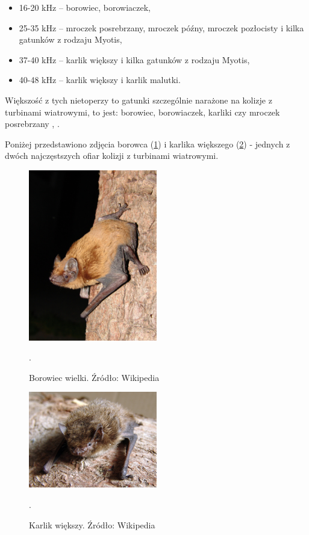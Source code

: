 \documentclass{sprz}
\begin{document}
\begin{itemize}
  \item{16-20 kHz – borowiec, borowiaczek,}
  \item{25-35 kHz – mroczek posrebrzany, mroczek późny, mroczek pozłocisty i kilka gatunków z rodzaju Myotis,}
  \item{37-40 kHz – karlik większy i kilka gatunków z rodzaju Myotis,}
  \item{40-48 kHz – karlik większy i karlik malutki.}
\end{itemize}

Większość z tych nietoperzy to gatunki szczególnie narażone na kolizje z turbinami wiatrowymi, to jest: borowiec, borowiaczek, karliki czy mroczek posrebrzany \cite{Wytyczne}, \cite{rodrigues}.

Poniżej przedstawiono zdjęcia borowca (\ref{img:Nyctalus_noctula}) i karlika większego (\ref{img:Pipistrellus_nathusii}) - jednych z dwóch najczęstszych ofiar kolizji z turbinami wiatrowymi.
\begin{figure}[h]
  \centering
  \includegraphics[width=0.5\textwidth]{sprz/Nyctalus_noctula.jpg}
  \caption{Borowiec wielki. Źródło: Wikipedia \cite{wiki-borowiec}}. 
  \label{img:Nyctalus_noctula}
\end{figure} 

\begin{figure}[h]
  \centering
  \includegraphics[width=0.5\textwidth]{sprz/Pipistrellus_nathusii.jpg}
  \caption{Karlik większy. Źródło: Wikipedia \cite{wiki-borowiec}}. 
  \label{img:Pipistrellus_nathusii}
\end{figure}
\end{document}
